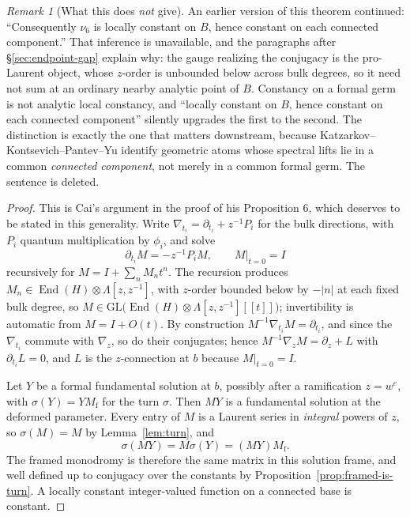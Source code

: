 \documentclass[11pt]{article}
\theoremstyle{definition}
\theoremstyle{remark}
\newtheorem{remark}[theorem]{Remark}
\begin{document}
\begin{remark}[What this does \emph{not} give]
\label{rem:no-local-constancy}
An earlier version of this theorem continued: ``Consequently $\nu_6$ is locally
constant on $B$, hence constant on each connected component.'' That inference is
unavailable, and the paragraphs after \S\ref{sec:endpoint-gap} explain why: the
gauge realizing the conjugacy is the pro-Laurent object, whose $z$-order is
unbounded below across bulk degrees, so it need not sum at an ordinary nearby
analytic point of $B$. Constancy on a formal germ is not analytic local
constancy, and ``locally constant on $B$, hence constant on each connected
component'' silently upgrades the first to the second. The distinction is exactly
the one that matters downstream, because Katzarkov--Kontsevich--Pantev--Yu
identify geometric atoms whose spectral lifts lie in a common \emph{connected
component}, not merely in a common formal germ. The sentence is deleted.
\end{remark}

\begin{proof}
This is Cai's argument in the proof of his Proposition 6, which deserves to be
stated in this generality. Write $\nabla_{t_i}=\partial_{t_i}+z^{-1}P_i$ for
the bulk directions, with $P_i$ quantum multiplication by $\phi_i$, and solve
\[
  \partial_{t_i}M=-z^{-1}P_iM,\qquad M|_{t=0}=I
\]
recursively for $M=I+\sum_{n}M_nt^n$. The recursion produces
$M_n\in\operatorname{End}(H)\otimes\Lambda[z,z^{-1}]$, with $z$-order bounded
below by $-|n|$ at each fixed bulk degree, so
$M\in\mathrm{GL}\bigl(\operatorname{End}(H)\otimes\Lambda[z,z^{-1}][[t]]\bigr)$;
invertibility is automatic from $M=I+O(t)$. By construction
$M^{-1}\nabla_{t_i}M=\partial_{t_i}$, and since the $\nabla_{t_i}$ commute with
$\nabla_z$, so do their conjugates; hence $M^{-1}\nabla_zM=\partial_z+L$ with
$\partial_{t_i}L=0$, and $L$ is the $z$-connection at $b$ because $M|_{t=0}=I$.

Let $Y$ be a formal fundamental solution at $b$, possibly after a ramification
$z=w^e$, with $\sigma(Y)=YM_{\mathrm f}$ for the turn $\sigma$. Then $MY$ is a
fundamental solution at the deformed parameter. Every entry of $M$ is a Laurent
series in \emph{integral} powers of $z$, so $\sigma(M)=M$ by
Lemma~\ref{lem:turn}, and
\[
  \sigma(MY)=M\sigma(Y)=(MY)M_{\mathrm f}.
\]
The framed monodromy is therefore the same matrix in this solution frame, and
well defined up to conjugacy over the constants by
Proposition~\ref{prop:framed-is-turn}. A locally constant integer-valued
function on a connected base is constant.
\end{proof}
\end{document}
